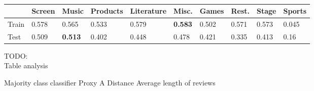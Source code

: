\\
\begin{table}[]
	\begin{tabular}{|l|l|l|l|l|l|l|l|l|l|}
		\hline
			  &	Screen & Music 			& Products  & Literature & Misc.		  & Games & Rest. & Stage & Sports      \\ \hline
		Train & 0.578  & 0.565 			& 0.533 	& 0.579 	 & \textbf{0.583} & 0.502 & 0.571 & 0.573 & 0.045 		\\ \hline
		Test  & 0.509  & \textbf{0.513} & 0.402     & 0.448      & 0.478          & 0.421 & 0.335 & 0.413 & 0.16		\\ \hline
	\end{tabular}
\end{table}
TODO:\\
Table analysis

Majority class classifier
Proxy A Distance
Average length of reviews
